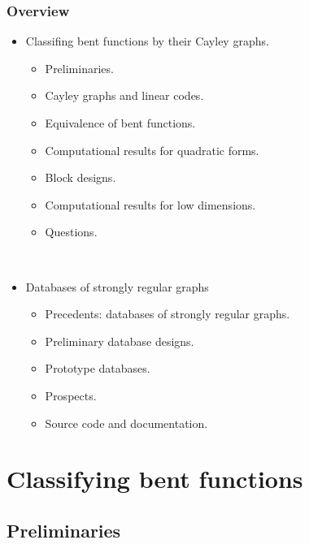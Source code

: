 \documentclass[pdf,sprung,slideColor,nocolorBG]{beamer}
\begin{document}
\begin{frame}
\frametitle{Overview}
\begin{itemize}
\item
Classifing bent functions by their Cayley graphs.
\begin{itemize}
\item
Preliminaries.
\item
Cayley graphs and linear codes.
\item
Equivalence of bent functions.
\item
Computational results for quadratic forms.
\item
Block designs.
\item
Computational results for low dimensions.
\item
Questions.
\end{itemize}

~

\item
Databases of strongly regular graphs
\begin{itemize}
\item
Precedents: databases of strongly regular graphs.

\item
Preliminary database designs.

\item
Prototype databases.

\item
Prospects.

\item
Source code and documentation.
\end{itemize}

\end{itemize}

\end{frame}

\section{Classifying bent functions}

\subsection{Preliminaries}
\end{document}
